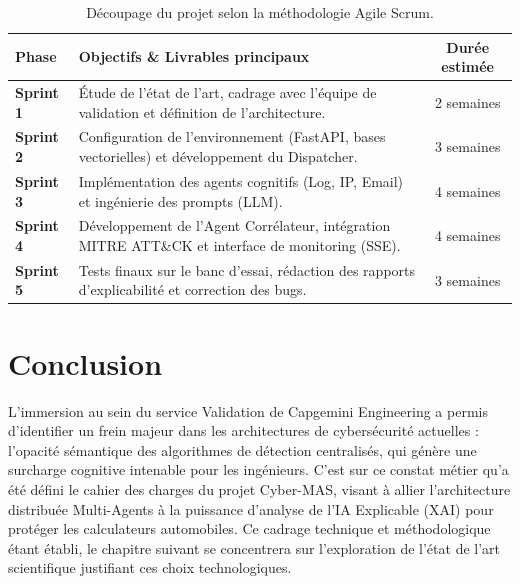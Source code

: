 \documentclass[a4paper, 12pt]{report}
\begin{document}
\begin{table}[htbp]
\centering
\caption[Découpage du projet selon la méthodologie Agile Scrum]{Découpage du projet selon la méthodologie Agile Scrum.}
\label{tab:planning_agile}
\vspace{0.2cm}
\begin{tabular}{|l|>{\raggedright\arraybackslash}p{8cm}|c|}
\hline
\textbf{Phase} & \textbf{Objectifs \& Livrables principaux} & \textbf{Durée estimée} \\ \hline
\textbf{Sprint 1} & Étude de l'état de l'art, cadrage avec l'équipe de validation et définition de l'architecture. & 2 semaines \\ \hline
\textbf{Sprint 2} & Configuration de l'environnement (FastAPI, bases vectorielles) et développement du Dispatcher. & 3 semaines \\ \hline
\textbf{Sprint 3} & Implémentation des agents cognitifs (Log, IP, Email) et ingénierie des prompts (LLM). & 4 semaines \\ \hline
\textbf{Sprint 4} & Développement de l'Agent Corrélateur, intégration MITRE ATT\&CK et interface de monitoring (SSE). & 4 semaines \\ \hline
\textbf{Sprint 5} & Tests finaux sur le banc d'essai, rédaction des rapports d'explicabilité et correction des bugs. & 3 semaines \\ \hline
\end{tabular}
\end{table}

\section*{Conclusion}
L'immersion au sein du service Validation de Capgemini Engineering a permis d'identifier un frein majeur dans les architectures de cybersécurité actuelles : l'opacité sémantique des algorithmes de détection centralisés, qui génère une surcharge cognitive intenable pour les ingénieurs. C'est sur ce constat métier qu'a été défini le cahier des charges du projet Cyber-MAS, visant à allier l'architecture distribuée Multi-Agents à la puissance d'analyse de l'IA Explicable (XAI) pour protéger les calculateurs automobiles. Ce cadrage technique et méthodologique étant établi, le chapitre suivant se concentrera sur l'exploration de l'état de l'art scientifique justifiant ces choix technologiques.
\end{document}
